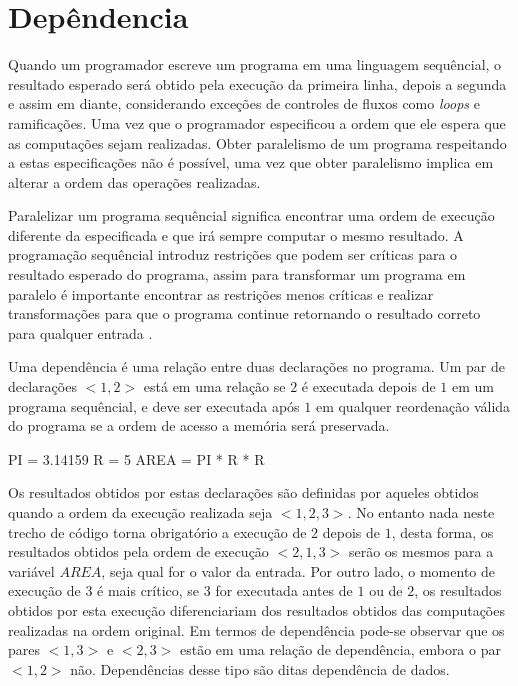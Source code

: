 
\section{Depêndencia}

Quando um programador escreve um programa em uma linguagem sequêncial, o
resultado esperado será obtido pela execução da primeira linha, depois a segunda
e assim em diante, considerando exceções de controles de fluxos como
\textit{loops} e ramificações. 
Uma vez que o programador especificou a ordem que ele espera que as computações 
sejam realizadas. 
Obter paralelismo de um programa respeitando a estas especificações não é
possível, uma vez que obter paralelismo implica em alterar a ordem das
operações realizadas.

Paralelizar um programa sequêncial significa encontrar uma ordem de execução
diferente da especificada e que irá sempre computar o mesmo resultado.
A programação sequêncial introduz restrições que podem ser críticas para o
resultado esperado do programa, assim para transformar um programa em paralelo é
importante encontrar as restrições menos críticas e realizar transformações para
que o programa continue retornando o resultado correto para qualquer entrada
\cite[1.8]{ocfma}.


Uma dependência é uma relação entre duas declarações no programa. 
Um par de declarações $<1,2>$ está em uma relação se $2$ é executada 
depois de $1$ em um programa sequêncial, e deve ser executada após $1$ 
em qualquer reordenação válida do programa se a ordem de acesso a 
memória será preservada.

\begin{algorithm}
        \begin{algorithmic}[1]
                \STATE PI = 3.14159
                \STATE R = 5
                \STATE AREA = PI * R * R
\end{algorithmic}
\end{algorithm}


Os resultados obtidos por estas declarações são definidas por aqueles obtidos
quando a ordem da execução realizada seja $<1,2,3>$. 
No entanto nada neste trecho de código torna obrigatório a execução de 
$2$ depois de $1$, desta forma, os resultados obtidos pela ordem de execução 
$<2,1,3>$ serão os mesmos para a variável $AREA$, seja qual for o valor 
da entrada.
Por outro lado, o momento de execução de $3$ é mais crítico, se $3$ for
executada antes de $1$ ou de $2$, os resultados obtidos por esta execução
diferenciariam dos resultados obtidos das computações realizadas na ordem
original.
Em termos de dependência pode-se observar que os pares $<1,3>$ e $<2,3>$
estão em uma relação de dependência, embora o par $<1,2>$ não.
Dependências desse tipo são ditas dependência de dados.

